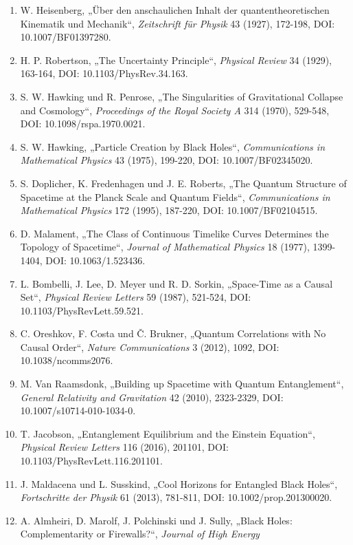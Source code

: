 \documentclass[
  11pt,
  a4paper,
]{article}
\providecommand{\tightlist}{%
  \setlength{\itemsep}{0pt}\setlength{\parskip}{0pt}}
\begin{document}
\begin{enumerate}
\def\labelenumi{\arabic{enumi}.}
\tightlist
\item
  W. Heisenberg, „Über den anschaulichen Inhalt der quantentheoretischen
  Kinematik und Mechanik``, \emph{Zeitschrift für Physik} 43 (1927),
  172-198, DOI: 10.1007/BF01397280.
\item
  H. P. Robertson, „The Uncertainty Principle``, \emph{Physical Review}
  34 (1929), 163-164, DOI: 10.1103/PhysRev.34.163.
\item
  S. W. Hawking und R. Penrose, „The Singularities of Gravitational
  Collapse and Cosmology``, \emph{Proceedings of the Royal Society A}
  314 (1970), 529-548, DOI: 10.1098/rspa.1970.0021.
\item
  S. W. Hawking, „Particle Creation by Black Holes``,
  \emph{Communications in Mathematical Physics} 43 (1975), 199-220, DOI:
  10.1007/BF02345020.
\item
  S. Doplicher, K. Fredenhagen und J. E. Roberts, „The Quantum Structure
  of Spacetime at the Planck Scale and Quantum Fields``,
  \emph{Communications in Mathematical Physics} 172 (1995), 187-220,
  DOI: 10.1007/BF02104515.
\item
  D. Malament, „The Class of Continuous Timelike Curves Determines the
  Topology of Spacetime``, \emph{Journal of Mathematical Physics} 18
  (1977), 1399-1404, DOI: 10.1063/1.523436.
\item
  L. Bombelli, J. Lee, D. Meyer und R. D. Sorkin, „Space-Time as a
  Causal Set``, \emph{Physical Review Letters} 59 (1987), 521-524, DOI:
  10.1103/PhysRevLett.59.521.
\item
  C. Oreshkov, F. Costa und Č. Brukner, „Quantum Correlations with No
  Causal Order``, \emph{Nature Communications} 3 (2012), 1092, DOI:
  10.1038/ncomms2076.
\item
  M. Van Raamsdonk, „Building up Spacetime with Quantum Entanglement``,
  \emph{General Relativity and Gravitation} 42 (2010), 2323-2329, DOI:
  10.1007/s10714-010-1034-0.
\item
  T. Jacobson, „Entanglement Equilibrium and the Einstein Equation``,
  \emph{Physical Review Letters} 116 (2016), 201101, DOI:
  10.1103/PhysRevLett.116.201101.
\item
  J. Maldacena und L. Susskind, „Cool Horizons for Entangled Black
  Holes``, \emph{Fortschritte der Physik} 61 (2013), 781-811, DOI:
  10.1002/prop.201300020.
\item
  A. Almheiri, D. Marolf, J. Polchinski und J. Sully, „Black Holes:
  Complementarity or Firewalls?{}``, \emph{Journal of High Energy
}
\end{enumerate}
\end{document}
